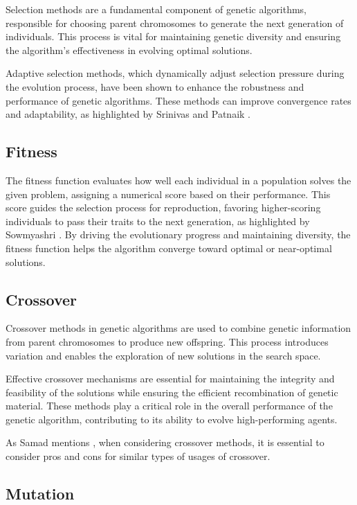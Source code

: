 \documentclass[a4paper, twocolumn]{article}
\begin{document}
Selection methods are a fundamental component of genetic algorithms, responsible for choosing parent chromosomes to generate the next generation of individuals. This process is vital for maintaining genetic diversity and ensuring the algorithm's effectiveness in evolving optimal solutions.

Adaptive selection methods, which dynamically adjust selection pressure during the evolution process, have been shown to enhance the robustness and performance of genetic algorithms. These methods can improve convergence rates and adaptability, as highlighted by Srinivas and Patnaik \cite{srinvas1994adaptive}.

\subsection{Fitness\label{sec:Fitness}}
The fitness function evaluates how well each individual in a population solves the given problem, assigning a numerical score based on their performance. This score guides the selection process for reproduction, favoring higher-scoring individuals to pass their traits to the next generation, as highlighted by Sowmyashri \cite{Sowmyashri2024fitness}. By driving the evolutionary progress and maintaining diversity, the fitness function helps the algorithm converge toward optimal or near-optimal solutions.

\subsection{Crossover\label{sec:Crossover}}

Crossover methods in genetic algorithms are used to combine genetic information from parent chromosomes to produce new offspring. This process introduces variation and enables the exploration of new solutions in the search space.

Effective crossover mechanisms are essential for maintaining the integrity and feasibility of the solutions while ensuring the efficient recombination of genetic material. These methods play a critical role in the overall performance of the genetic algorithm, contributing to its ability to evolve high-performing agents.

As Samad mentions \cite{samad2020review}, when considering crossover methods, it is essential to consider pros and cons for similar types of usages of crossover.


\subsection{Mutation\label{sec:Mutation}}
\end{document}
